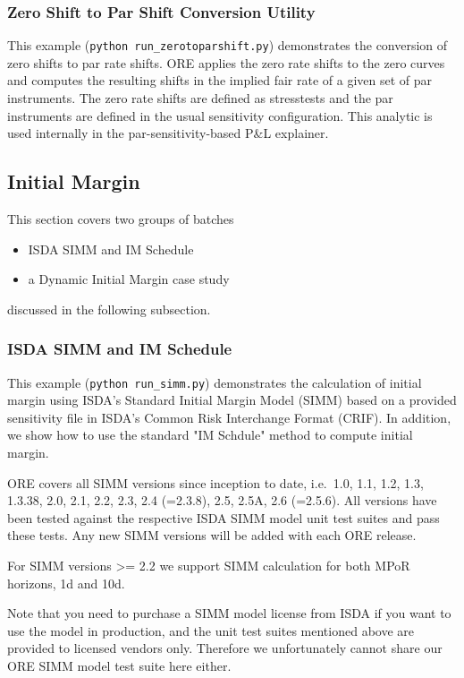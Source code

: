 \subsubsection{Zero Shift to Par Shift Conversion Utility}
\label{example:marketrisk_zerotoparshift}

This example ({\tt python run\_zerotoparshift.py}) demonstrates the conversion of zero shifts to par rate
shifts. ORE applies the zero rate shifts to the zero curves and computes the resulting shifts in the
implied fair rate of a given set of par instruments.  The zero rate shifts are defined as stresstests
and the par instruments are defined in the usual sensitivity configuration.
This analytic is used internally in the par-sensitivity-based P\&L explainer.
 
\subsection{Initial Margin}\label{example:initialmargin}

This section covers two groups of batches
\begin{itemize}
\item ISDA SIMM and IM Schedule
\item a Dynamic Initial Margin case study
\end{itemize}
discussed in the following subsection.

\subsubsection{ISDA SIMM and IM Schedule}

This example ({\tt python run\_simm.py}) demonstrates the calculation of initial margin using ISDA's Standard Initial Margin Model (SIMM) based on a provided 
sensitivity file in ISDA's Common Risk Interchange Format (CRIF). In addition, we show how to use the standard "IM Schdule" method to compute 
initial margin.

ORE covers all SIMM versions since inception to date, i.e.\ 1.0, 1.1, 1.2, 1.3, 1.3.38, 2.0, 2.1, 2.2, 2.3, 2.4 (=2.3.8), 2.5, 2.5A, 2.6 (=2.5.6).
All versions have been tested against the respective ISDA SIMM model unit test suites and pass these tests.
Any new SIMM versions will be added with each ORE release.

For SIMM versions >= 2.2 we support SIMM calculation for both MPoR horizons, 1d and 10d.
 
Note that you need to purchase a SIMM model license from ISDA if you want to use the model in production, and the unit test
suites mentioned above are provided to licensed vendors only. Therefore we unfortunately cannot share our ORE SIMM model 
test suite here either. 

